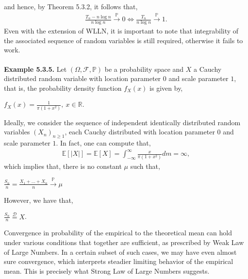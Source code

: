 \documentclass{article}
\begin{document}
and hence, by Theorem 5.3.2, it follows that,
\begin{eqnarray}
\nonumber
\frac{T_n - n\log{n}}{n\log{n}} \xrightarrow{\mathbb{P}} 0 \iff \frac{T_n}{n\log{n}} \xrightarrow{\mathbb{P}} 1.
\end{eqnarray}
Even with the extension of WLLN, it is important to note that integrability of the associated sequence of random variables is still required, otherwise it fails to work.\\\\
\textbf{Example 5.3.5.} Let $(\Omega,\mathcal{F},\mathbb{P})$ be a probability space and $X$ a Cauchy distributed random variable with location parameter $0$ and scale parameter $1$, that is, the probability density function $f_X(x)$ is given by,
\begin{center}
	$f_X(x) = \frac{1}{\pi(1+x^2)}, \ x\in\mathbb{R}$.
\end{center}
Ideally, we consider the sequence of independent identically distributed random variables $(X_n)_{n\geq1}$, each Cauchy distributed with location parameter $0$ and scale parameter ${1}$. In fact, one can compute that,
\begin{eqnarray}
\nonumber
\mathbb{E}[|X|] = \mathbb{E}[X] = \int_{-\infty}^{\infty}\frac{x}{\pi(1+x^2)}dm = \infty,
\end{eqnarray}
which implies that, there is no constant $\mu$ such that,
\begin{center}
	$\frac{S_n}{n} = \frac{X_1 + ... + X_n}{n} \xrightarrow{\mathbb{P}} \mu$
\end{center}
However, we have that,
\begin{center}
	$\frac{S_n}{n} \overset{\mathrm{\mathcal{D}}}{=} X$.
\end{center}
Convergence in probability of the empirical to the theoretical mean can hold under various conditions that together are sufficient, as prescribed by Weak Law of Large Numbers. In a certain subset of such cases, we may have even almost sure convergence, which interprets steadier limiting behavior of the empirical mean. This is precisely what Strong Law of Large Numbers suggests.\\\\
\noindent{}\\\\\\
\end{document}
